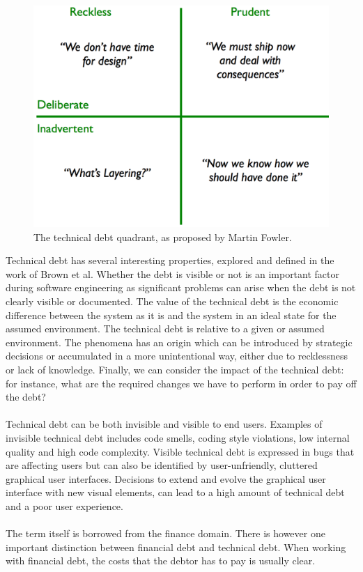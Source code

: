 \begin{figure}[!h]
	\centering
	\includegraphics[width=0.5\columnwidth]{images/introduction/technical_debt_quadrant}
	\caption{The technical debt quadrant, as proposed by Martin Fowler.}
	\label{fig:technical-debt-quadrant}
\end{figure}

Technical debt has several interesting properties, explored and defined in the work of Brown et al\cite{brown2010managing}. 
Whether the debt is visible or not is an important factor during software engineering as significant problems can arise when the debt is not clearly visible or documented.
The value of the technical debt is the economic difference between the system as it is and the system in an ideal state for the assumed environment.
The technical debt is relative to a given or assumed environment.
The phenomena has an origin which can be introduced by strategic decisions or accumulated in a more unintentional way, either due to recklessness or lack of knowledge.
Finally, we can consider the impact of the technical debt: for instance, what are the required changes we have to perform in order to pay off the debt?\\\\
Technical debt can be both invisible and visible to end users\cite{kruchten2012technical}.
Examples of invisible technical debt includes code smells, coding style violations, low internal quality and high code complexity.
Visible technical debt is expressed in bugs that are affecting users but can also be identified by user-unfriendly, cluttered graphical user interfaces.
Decisions to extend and evolve the graphical user interface with new visual elements, can lead to a high amount of technical debt and a poor user experience.\\\\
The term itself is borrowed from the finance domain\cite{guo2011portfolio}.
There is however one important distinction between financial debt and technical debt.
When working with financial debt, the costs that the debtor has to pay is usually clear.
